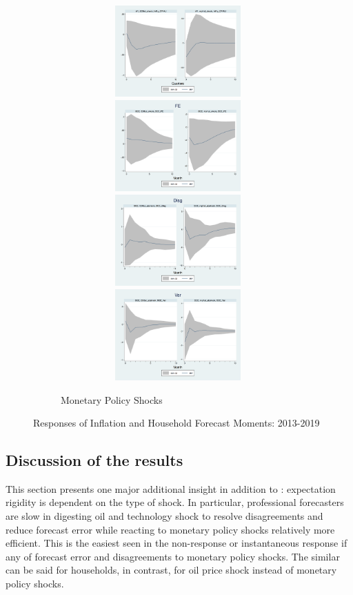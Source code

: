 \documentclass[12pt]{article}
\begin{document}
\begin{figure}[p]
\begin{subfigure}[b]{0.65\textwidth}
			\caption{Monetary Policy Shocks}
			\includegraphics[width=9cm,height=3.5cm]{figures/CPIAU_ashocksM.png} 
			\smallskip
			\includegraphics[width=9cm,height=3.5cm]{figures/SCEFE_ashocksM.png} 
			\smallskip
			\includegraphics[width=9cm,height=3.5cm]{figures/SCEDisg_ab_ashocksM.png} 
			\smallskip 
			\includegraphics[width=9cm,height=3.5cm]{figures/SCEVar_ab_ashocksM.png} 
		\end{subfigure}
		\caption{ Responses of Inflation and Household Forecast Moments: 2013-2019}
		\label{SCE_IR}
	\end{figure}
		
	\subsection{Discussion of the results}
	
	This section presents one major additional insight in addition to \cite{coibion2012can}: expectation rigidity is dependent on the type of shock. In particular, professional forecasters are slow in digesting oil and technology shock to resolve disagreements and reduce forecast error while reacting to monetary policy shocks relatively more efficient. This is the easiest seen in the non-response or instantaneous response if any of forecast error and disagreements to monetary policy shocks. The similar can be said for households, in contrast, for oil price shock instead of monetary policy shocks.
	
\end{document}

